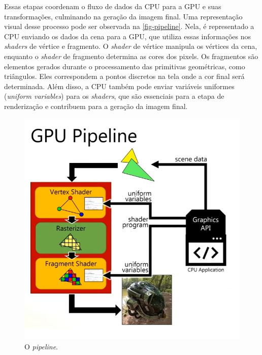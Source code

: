 \documentclass[english,
               brazil,
               bsc] %
               {dcomp-abntex2}
\begin{document}


Essas etapas coordenam o fluxo de dados da CPU para a GPU e suas transformações, culminando na geração da imagem final. Uma representação visual desse processo pode ser observada na \autoref{fig-pipeline}. Nela, é representado a CPU enviando os dados da cena para a GPU, que utiliza essas informações nos \textit{shaders} de vértice e fragmento. O \textit{shader} de vértice manipula os vértices da cena, enquanto o \textit{shader} de fragmento determina as cores dos pixels. Os fragmentos são elementos gerados durante o processamento das primitivas geométricas, como triângulos. Eles correspondem a pontos discretos na tela onde a cor final será determinada. Além disso, a CPU também pode enviar variáveis uniformes (\textit{uniform variables}) para os \textit{shaders}, que são essenciais para a etapa de renderização e contribuem para a geração da imagem final.


\begin{figure}[H]
        \caption{\label{fig-pipeline}\small O \textit{pipeline}.}
        \begin{center}
            \includegraphics[scale=0.45]{./Imagens/gpu_pipeline.png}
        \end{center}
\end{figure}
\end{document}

